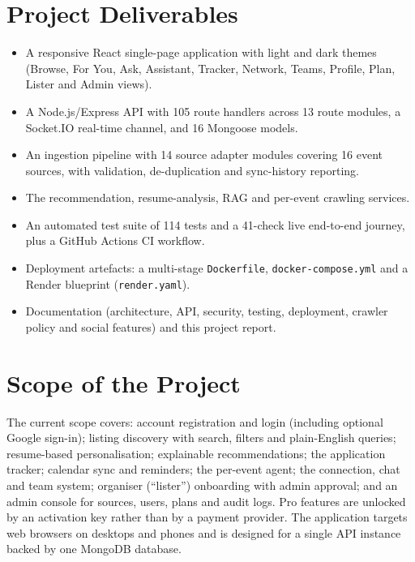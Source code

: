 \documentclass[12pt,a4paper]{report}
\begin{document}
\section{Project Deliverables}
\begin{itemize}[leftmargin=*]
    \item A responsive React single-page application with light and dark themes (Browse, For You, Ask, Assistant, Tracker, Network, Teams, Profile, Plan, Lister and Admin views).
    \item A Node.js/Express API with 105 route handlers across 13 route modules, a Socket.IO real-time channel, and 16 Mongoose models.
    \item An ingestion pipeline with 14 source adapter modules covering 16 event sources, with validation, de-duplication and sync-history reporting.
    \item The recommendation, resume-analysis, RAG and per-event crawling services.
    \item An automated test suite of 114 tests and a 41-check live end-to-end journey, plus a GitHub Actions CI workflow.
    \item Deployment artefacts: a multi-stage \texttt{Dockerfile}, \texttt{docker-compose.yml} and a Render blueprint (\texttt{render.yaml}).
    \item Documentation (architecture, API, security, testing, deployment, crawler policy and social features) and this project report.
\end{itemize}

\section{Scope of the Project}
The current scope covers: account registration and login (including optional Google sign-in); listing discovery with search, filters and plain-English queries; resume-based personalisation; explainable recommendations; the application tracker; calendar sync and reminders; the per-event agent; the connection, chat and team system; organiser (``lister'') onboarding with admin approval; and an admin console for sources, users, plans and audit logs. Pro features are unlocked by an activation key rather than by a payment provider. The application targets web browsers on desktops and phones and is designed for a single API instance backed by one MongoDB database.
\end{document}
